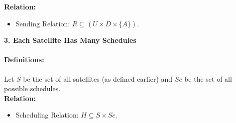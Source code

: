 \documentclass[12pt]{article}
\begin{document}
\textbf{Relation:}
\begin{itemize}
  \item Sending Relation: $R \subseteq (U \times D \times \{A\})$.
\end{itemize}

\textbf{3. Each Satellite Has Many Schedules}

\paragraph{Definitions:}
Let $S$ be the set of all satellites (as defined earlier) and $Sc$ be the set of all possible schedules.\\

\textbf{Relation:}
\begin{itemize}
  \item Scheduling Relation: $H \subseteq S \times Sc$.
\end{itemize}
\end{document}
